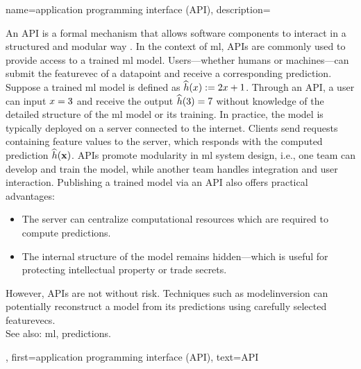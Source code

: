 {name={application programming interface (API)},
		description={An  API is a formal mechanism that 
			allows software components to interact in a structured and modular way \cite{RestfulBook2013}.
			In the context of \gls{ml}, APIs are commonly used to provide access to a trained \gls{ml} \gls{model}. 
			Users—whether humans or machines—can submit the \gls{featurevec} of a \gls{datapoint} and receive 
			a corresponding \gls{prediction}. Suppose a trained \gls{ml} \gls{model} is defined 
			as $\widehat{h}(x) := 2 x + 1$. Through an API, a user 
			can input $x = 3$ and receive the output $\widehat{h}(3) = 7$ 
			without knowledge of the detailed structure of the \gls{ml} \gls{model} or its training. 
			In practice, the \gls{model} is typically deployed on a server connected to the internet. 
			Clients send requests containing \gls{feature} values to the server, which responds with 
			the computed \gls{prediction} $\widehat{h}({\bf x})$. APIs promote modularity 
			in \gls{ml} system design, i.e., one team can develop and train the \gls{model}, while another team
			handles integration and user interaction. Publishing a trained \gls{model} via an API also 
			offers practical advantages: 
			\begin{itemize} 
				\item The server can centralize computational resources which are required to compute \glspl{prediction}. 
		        \item The internal structure of the \gls{model} remains hidden—which is useful for protecting intellectual property or trade secrets. 
		    	\end{itemize} 
			However, APIs are not without \gls{risk}. Techniques such as \gls{modelinversion} can potentially reconstruct a 
			\gls{model} from its \glspl{prediction} using carefully selected \glspl{featurevec}.
					\\
			See also: \gls{ml}, \glspl{prediction}.},
		first={application programming interface (API)},
		text={API}
}

